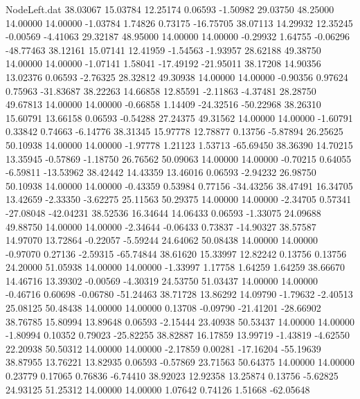 \begin{filecontents}{NodeLeft.dat}
  38.03067   15.03784   12.25174     0.06593   -1.50982   29.03750   48.25000   14.00000   14.00000   -1.03784    1.74826    0.73175  -16.75705
  38.07113   14.29932   12.35245    -0.00569   -4.41063   29.32187   48.95000   14.00000   14.00000   -0.29932    1.64755   -0.06296  -48.77463
  38.12161   15.07141   12.41959    -1.54563   -1.93957   28.62188   49.38750   14.00000   14.00000   -1.07141    1.58041  -17.49192  -21.95011
  38.17208   14.90356   13.02376     0.06593   -2.76325   28.32812   49.30938   14.00000   14.00000   -0.90356    0.97624    0.75963  -31.83687
  38.22263   14.66858   12.85591    -2.11863   -4.37481   28.28750   49.67813   14.00000   14.00000   -0.66858    1.14409  -24.32516  -50.22968
  38.26310   15.60791   13.66158     0.06593   -0.54288   27.24375   49.31562   14.00000   14.00000   -1.60791    0.33842    0.74663   -6.14776
  38.31345   15.97778   12.78877     0.13756   -5.87894   26.25625   50.10938   14.00000   14.00000   -1.97778    1.21123    1.53713  -65.69450
  38.36390   14.70215   13.35945    -0.57869   -1.18750   26.76562   50.09063   14.00000   14.00000   -0.70215    0.64055   -6.59811  -13.53962
  38.42442   14.43359   13.46016     0.06593   -2.94232   26.98750   50.10938   14.00000   14.00000   -0.43359    0.53984    0.77156  -34.43256
  38.47491   16.34705   13.42659    -2.33350   -3.62275   25.11563   50.29375   14.00000   14.00000   -2.34705    0.57341  -27.08048  -42.04231
  38.52536   16.34644   14.06433     0.06593   -1.33075   24.09688   49.88750   14.00000   14.00000   -2.34644   -0.06433    0.73837  -14.90327
  38.57587   14.97070   13.72864    -0.22057   -5.59244   24.64062   50.08438   14.00000   14.00000   -0.97070    0.27136   -2.59315  -65.74844
  38.61620   15.33997   12.82242     0.13756    0.13756   24.20000   51.05938   14.00000   14.00000   -1.33997    1.17758    1.64259    1.64259
  38.66670   14.46716   13.39302    -0.00569   -4.30319   24.53750   51.03437   14.00000   14.00000   -0.46716    0.60698   -0.06780  -51.24463
  38.71728   13.86292   14.09790    -1.79632   -2.40513   25.08125   50.48438   14.00000   14.00000    0.13708   -0.09790  -21.41201  -28.66902
  38.76785   15.80994   13.89648     0.06593   -2.15444   23.40938   50.53437   14.00000   14.00000   -1.80994    0.10352    0.79023  -25.82255
  38.82887   16.17859   13.99719    -1.43819   -4.62550   22.20938   50.50312   14.00000   14.00000   -2.17859    0.00281  -17.16204  -55.19639
  38.87955   13.76221   13.82935     0.06593   -0.57869   23.71563   50.64375   14.00000   14.00000    0.23779    0.17065    0.76836   -6.74410
  38.92023   12.92358   13.25874     0.13756   -5.62825   24.93125   51.25312   14.00000   14.00000    1.07642    0.74126    1.51668  -62.05648

\end{filecontents}
